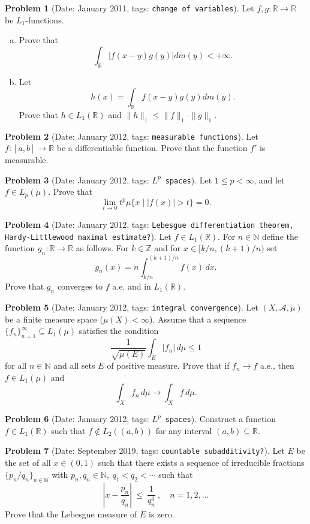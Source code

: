 \documentclass[11pt, notitlepage]{article}
\theoremstyle{definition}
\theoremstyle{definition}
\theoremstyle{definition}
\newtheorem{probstate}{Problem}
\theoremstyle{remark}
\newenvironment{problem}[2]{
    \begin{probstate}[Date: #1, tags: \texttt{#2}]
}
{
  \end{probstate}
}
\newcommand{\R}{\mathbb{R}}
\newcommand{\Z}{\mathbb{Z}}
\newcommand{\N}{\mathbb{N}}
\begin{document}
\begin{problem}{January 2011}{change of variables}
  Let $f,g: \mathbb R \rightarrow \mathbb R$ be $L_1$-functions.
  \begin{enumerate}[(a)]
\item Prove that
\[
\int_{\mathbb R} |f(x-y)g(y)| dm(y) < +\infty.
\]
  \item Let
\[
h(x)= \int_{\mathbb R} f(x-y)g(y) dm(y).
\]
Prove that $h \in L_1(\mathbb R)$ and $\|h\|_1 \le \|f\|_1 \cdot \|g\|_1$.
\end{enumerate}
\end{problem}

\begin{problem}{January 2012}{measurable functions}
  Let $f : [a,b] \to \R$ be a differentiable function.  Prove that the function $f'$ is measurable.
\end{problem}

\begin{problem}{January 2012}{$L^p$ spaces}
  Let $1 \le p < \infty$, and let $f \in L_p(\mu)$. Prove that
\[
 \lim_{t \to 0} t^p \mu \{x \mid |f(x)|>t \} =0.
\]
\end{problem}

\begin{problem}{January 2012}{Lebesgue differentiation theorem, Hardy-Littlewood maximal estimate?}
  Let  $f \in L_1(\R)$.
  For $n \in \N$ define the function $g_n: \R \to \R$ as follows.  For $k \in \Z$ and for $x \in [k/n,(k+1)/n)$ set
\[
 g_n(x)=n \int_{k/n}^{(k+1)/n} f (x) \, dx.
\]
Prove that $g_n$ converges to $f$ a.e. and in $L_1(\R)$.
\end{problem}

\begin{problem}{January 2012}{integral convergence}
  Let $(X, \mathcal{A}, \mu)$ be a finite measure space ($\mu(X)< \infty$). Assume that a sequence $\{f_n\}_{n=1}^{\infty} \subseteq L_1(\mu)$ satisfies the condition
\[
  \frac{1}{\sqrt{\mu(E)}} \int_E |f_n| \, d\mu \le 1
\]
for all $n \in \N$ and all sets $E$ of positive measure. Prove that if $f_n \to f$ a.e., then $f \in L_1(\mu)$ and
\[
  \int_X f_n \, d \mu \to \int_X f \, d \mu.
 \]
\end{problem}

\begin{problem}{January 2012}{$L^p$ spaces}
  Construct a function $f \in L_1(\R)$ such that $f \notin L_2((a,b))$ for any interval $(a,b) \subseteq \R$.
\end{problem}

\begin{problem}{September 2019}{countable subadditivity?}
  Let $E$ be the set of all $x\in(0,1)$ such that there exists  a sequence of irreducible fractions
$\{p_n/q_n\}_{n\in\mathbb{N}}$ with $p_n,q_n\in\mathbb{N}, \ q_1<q_2<\cdots$ such that
$$
\left|x-\frac{p_n}{q_n}\right| \ \le \ \frac{1}{q_n^3} \ , \quad n=1,2,...
$$
Prove that the Lebesgue measure of $E$ is zero.
\end{problem}
\end{document}
